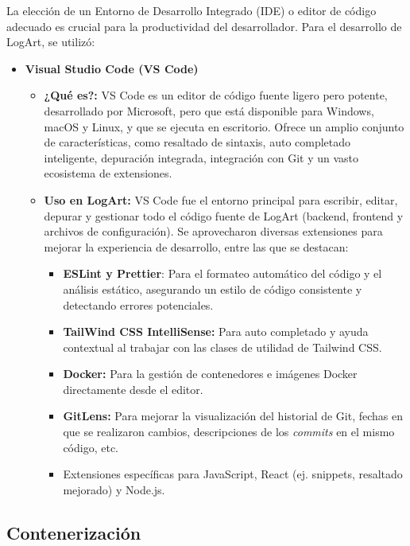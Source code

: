La elección de un Entorno de Desarrollo Integrado (IDE) o editor de código adecuado es crucial para la productividad del desarrollador. Para el desarrollo de LogArt, se utilizó:
    \begin{itemize}
        \item \textbf{Visual Studio Code (VS Code)}
            \begin{itemize}
                \item \textbf{¿Qué es?:} VS Code es un editor de código fuente ligero pero potente, desarrollado por Microsoft, pero que está disponible para Windows, macOS y Linux, y que se ejecuta en escritorio. Ofrece un amplio conjunto de características, como resaltado de sintaxis, auto completado inteligente, depuración integrada, integración con Git y un vasto ecosistema de extensiones.
                \item \textbf{Uso en LogArt:} VS Code fue el entorno principal para escribir, editar, depurar y gestionar todo el código fuente de LogArt (backend, frontend y archivos de configuración). Se aprovecharon diversas extensiones para mejorar la experiencia de desarrollo, entre las que se destacan:
                    \begin{itemize}
                        \item \textbf{ESLint y Prettier}: Para el formateo automático del código y el análisis estático, asegurando un estilo de código consistente y detectando errores potenciales.
                        \item \textbf{TailWind CSS IntelliSense:} Para auto completado y ayuda contextual al trabajar con las clases de utilidad de Tailwind CSS.
                        \item \textbf{Docker:} Para la gestión de contenedores e imágenes Docker directamente desde el editor.
                        \item \textbf{GitLens:} Para mejorar la visualización del historial de Git, fechas en que se realizaron cambios, descripciones de los \textit{commits} en el mismo código, etc.
                        \item Extensiones específicas para JavaScript, React (ej. snippets, resaltado mejorado) y Node.js.
                    \end{itemize}
            \end{itemize}
    \end{itemize}

\subsection{Contenerización}
\label{sec:contenedores}

